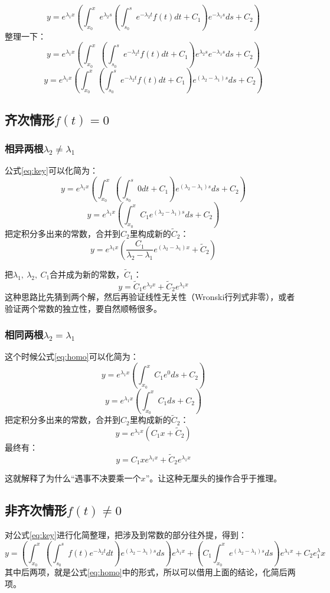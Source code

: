 \documentclass[UTF8]{ctexart}
\begin{document}
\[y = e^{\lambda _1 x}\left (\int_{x_0}^{x} e^{\lambda _2s}\left ( \int _{s_0} ^s e^{-\lambda _2t}f(t)dt+C_1\right ) e^{-\lambda _1 s}ds+C_2\right )\]
整理一下：
\[y = e^{\lambda _1 x}\left (\int_{x_0}^{x} \left ( \int _{s_0} ^s e^{-\lambda _2t}f(t)dt+C_1\right ) e^{\lambda _2s}e^{-\lambda _1 s}ds+C_2\right )\]
\begin{equation}\label{eq:key}
    y = e^{\lambda _1 x}\left (\int_{x_0}^{x} \left ( \int _{s_0} ^s e^{-\lambda _2t}f(t)dt+C_1\right ) e^{(\lambda _2-\lambda _1 )s}ds+C_2\right )
\end{equation}
\subsection{齐次情形$f(t)=0$}
\subsubsection{相异两根$\lambda _2 \neq \lambda _1$}
公式\ref{eq:key}可以化简为：
\[y = e^{\lambda _1 x}\left (\int_{x_0}^{x} \left ( \int _{s_0} ^s 0dt+C_1\right ) e^{(\lambda _2-\lambda _1 )s}ds+C_2\right )\]
\begin{equation}\label{eq:homo}
y = e^{\lambda _1 x}\left (\int_{x_0}^{x} C_1 e^{(\lambda _2-\lambda _1 )s}ds+C_2\right )
\end{equation}
把定积分多出来的常数，合并到$C_2$里构成新的$\tilde C_2$：
\[y = e^{\lambda _1 x}\left (\frac{C_1}{\lambda _2-\lambda _1}e^{(\lambda _2-\lambda _1 )x}+\tilde C_2\right )\]

把$\lambda _1,\ \lambda _2,\ C_1$合并成为新的常数，$\tilde C_1$：
\[y=\tilde C_1e^{\lambda _2x}+\tilde C_2e^{\lambda _1 x}\]
这种思路比先猜到两个解，然后再验证线性无关性（Wronski行列式非零），或者验证两个常数的独立性，要自然顺畅很多。
\subsubsection{相同两根$\lambda _2 =\lambda _1$}
这个时候公式\ref{eq:homo}可以化简为：
\[y = e^{\lambda _1 x}\left (\int_{x_0}^{x} C_1 e^{0}ds+C_2\right )\]
\[y = e^{\lambda _1 x}\left (\int_{x_0}^{x} C_1 ds+C_2\right )\]
把定积分多出来的常数，合并到$C_2$里构成新的$\tilde C_2$：
\[y = e^{\lambda _1 x}\left (C_1x +\tilde C_2\right )\]
最终有：
\[y= C_1xe^{\lambda _1x}+\tilde C_2e^{\lambda _1 x}\]

这就解释了为什么“遇事不决要乘一个$x$”。让这种无厘头的操作合乎于推理。
\subsection{非齐次情形$f(t)\neq 0$}
对公式\ref{eq:key}进行化简整理，把涉及到常数的部分往外提，得到：
\[y=\left(\int^x_{x_0}\left(\int_{s_0}^s f(t)e^{-\lambda _2t}dt\right)e^{(\lambda _2-\lambda _1)s}ds\right)e^{\lambda _1x}+\left(C_1\int^x_{x_0}e^{(\lambda _2-\lambda _1)s}ds\right)e^{\lambda _1x}+C_2e^\lambda _1 x\]
其中后两项，就是公式\ref{eq:homo}中的形式，所以可以借用上面的结论，化简后两项。
\end{document}
